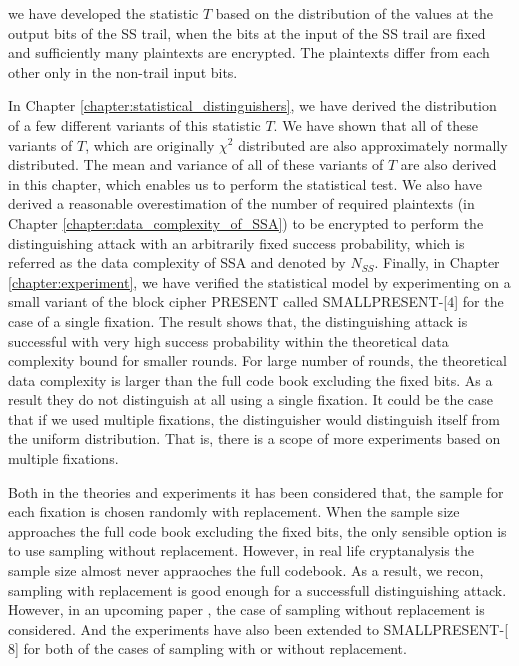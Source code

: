 we have developed the statistic $T$ based on the distribution of the values at the output bits of the SS trail, when the bits at the input of the SS trail are fixed and sufficiently many plaintexts are encrypted. The plaintexts differ from each other only in the non-trail input bits. \par \noindent In Chapter \ref{chapter:statistical_distinguishers}, we have derived the distribution of a few different variants of this statistic $T$. We have shown that all of these variants of $T$, which are originally $\chi^2$ distributed are also approximately normally distributed. The mean and variance of all of these variants of $T$ are also derived in this chapter, which enables us to perform the statistical test. We also have derived a reasonable overestimation of the number of required plaintexts (in Chapter \ref{chapter:data_complexity_of_SSA}) to be encrypted to perform the distinguishing attack with an arbitrarily fixed success probability, which is referred as the data complexity of SSA and denoted by $N_{SS}$. Finally, in Chapter \ref{chapter:experiment}, we have verified the statistical model by experimenting on a small variant of the block cipher PRESENT called SMALLPRESENT-[$4$] for the case of a single fixation. The result shows that, the distinguishing attack is successful with very high success probability within the theoretical data complexity bound for smaller rounds. For large number of rounds, the theoretical data complexity is larger than the full code book excluding the fixed bits. As a result they do not distinguish at all using a single fixation. It could be the case that if we used multiple fixations, the distinguisher would distinguish itself from the uniform distribution. That is, there is a scope of more experiments based on multiple fixations.
\par \noindent Both in the theories and experiments it has been considered that, the sample for each fixation is chosen randomly with replacement. When the sample size approaches the full code book excluding the fixed bits, the only sensible option is to use sampling without replacement. However, in real life cryptanalysis the sample size almost never appraoches the full codebook. As a result, we recon, sampling with replacement is good enough for a successfull distinguishing attack. However, in an upcoming paper \citep{kaisa_mohsin_2015},  the case of sampling without replacement is considered. And the experiments have also been extended to SMALLPRESENT-[$8$] for both of the cases of sampling with or without replacement.

